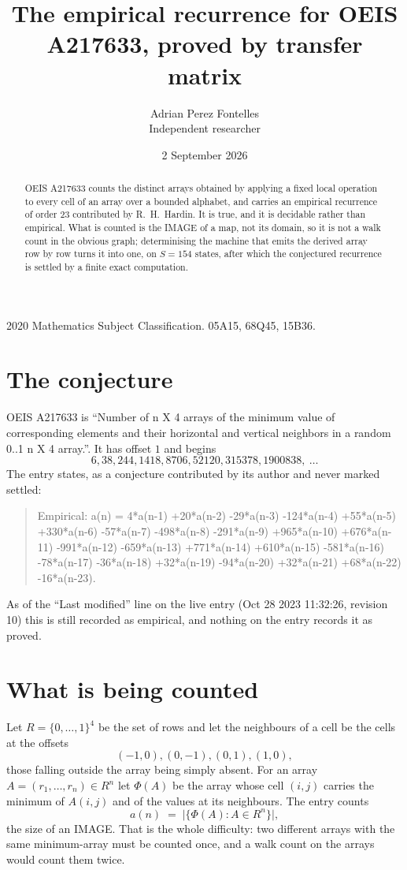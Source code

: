 \documentclass[11pt,a4paper]{article}
\title{The empirical recurrence for OEIS A217633, proved by transfer matrix}
\author{Adrian Perez Fontelles\\ \small Independent researcher}
\date{2 September 2026}
\theoremstyle{plain}
\theoremstyle{definition}
\begin{document}
\maketitle

\begin{abstract}
OEIS A217633 counts the distinct arrays obtained by applying a fixed local operation to every cell
of an array over a bounded alphabet, and carries an empirical recurrence of order $23$
contributed by R.~H.~Hardin. It is true, and it is decidable rather than empirical. What is
counted is the IMAGE of a map, not its domain, so it is not a walk count in the obvious graph;
determinising the machine that emits the derived array row by row turns it into one, on
$S=154$ states, after which the conjectured recurrence is settled by a finite exact
computation.
\end{abstract}

\noindent\small 2020 Mathematics Subject Classification. 05A15, 68Q45, 15B36.\normalsize

\section{The conjecture}

OEIS A217633 is ``Number of n X 4 arrays of the minimum value of corresponding elements and their horizontal and vertical neighbors in a random 0..1 n X 4 array.''. It has offset $1$ and begins
\[
6, 38, 244, 1418, 8706, 52120, 315378, 1900838,\ \dots
\]
The entry states, as a conjecture contributed by its author and never marked settled:
\begin{quote}
Empirical: a(n) = 4*a(n-1) +20*a(n-2) -29*a(n-3) -124*a(n-4) +55*a(n-5) +330*a(n-6) -57*a(n-7) -498*a(n-8) -291*a(n-9) +965*a(n-10) +676*a(n-11) -991*a(n-12) -659*a(n-13) +771*a(n-14) +610*a(n-15) -581*a(n-16) -78*a(n-17) -36*a(n-18) +32*a(n-19) -94*a(n-20) +32*a(n-21) +68*a(n-22) -16*a(n-23).
\end{quote}
As of the ``Last modified'' line on the live entry (Oct 28 2023 11:32:26, revision 10) this is still
recorded as empirical, and nothing on the entry records it as proved.

\section{What is being counted}

Let $R=\{0,\dots,1\}^{4}$ be the set of rows and let the neighbours of
a cell be the cells at the offsets
\[
(-1,0), (0,-1), (0,1), (1,0),
\]
those falling outside the array being simply absent. For an array
$A=(r_1,\dots,r_n)\in R^n$ let $\Phi(A)$ be the array whose cell $(i,j)$ carries the
minimum of $A(i,j)$ and of the values at its neighbours. The entry counts
\[
a(n)\;=\;\bigl|\{\Phi(A):A\in R^n\}\bigr| ,
\]
the size of an IMAGE. That is the whole difficulty: two different arrays with the same
minimum-array must be counted once, and a walk count on the arrays would count them twice.
\end{document}
